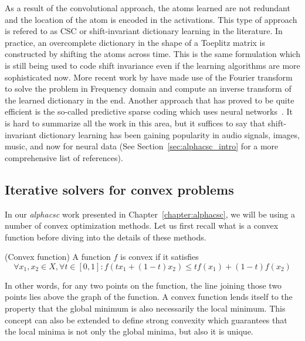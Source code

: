 As a result of the convolutional approach, the atoms learned are not redundant and the location of the atom is encoded in the activations. This type of approach is refered to as \ac{CSC} or shift-invariant dictionary learning in the literature. In practice, an overcomplete dictionary in the shape of a Toeplitz matrix is constructed by shifting the atoms across time. This is the same formulation which is still being used to code shift invariance even if the learning algorithms are more sophisticated now. More recent work by \cite{grosse2012shift} have made use of the Fourier transform to solve the problem in Frequency domain and compute an inverse transform of the learned dictionary in the end. Another approach that has proved to be quite efficient is the so-called predictive sparse coding which uses neural networks~\citep{kavukcuoglu2010learning}. It is hard to summarize all the work in this area, but it suffices to say that shift-invariant dictionary learning has been gaining popularity in audio signals, images, music, and now for neural data (See Section~\ref{sec:alphacsc_intro} for a more comprehensive list of references).

\subsection{Iterative solvers for convex problems}

In our \emph{alphacsc} work presented in Chapter~\ref{chapter:alphacsc}, we will be using a number of convex optimization methods. Let us first recall what is a convex function before diving into the details of these methods.
\vspace{\parskip}
\begin{definition}{(Convex function)}
A function $f$ is convex if it satisfies
\begin{equation}
\forall x_1, x_2 \in X, \forall t \in [0, 1]: f(tx_1 + (1 - t)x_2) \leq tf(x_1) + (1 - t)f(x_2)
\end{equation}
\end{definition}

In other words, for any two points on the function, the line joining those two points lies above the graph of the function. A convex function lends itself to the property that the global minimum is also necessarily the local minimum. This concept can also be extended to define strong convexity which guarantees that the local minima is not only the global minima, but also it is unique.

